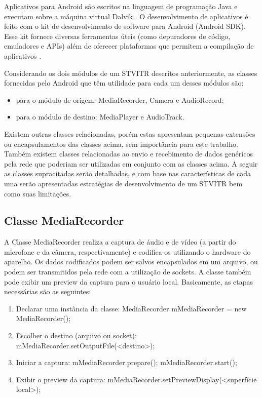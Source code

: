 \documentclass{acm_proc_article-sp}
\begin{document}
Aplicativos para Android são escritos na linguagem de programação Java e executam sobre a máquina virtual Dalvik  . O desenvolvimento de aplicativos é feito com o kit de desenvolvimento de software para Android (Android SDK). Esse kit fornece diversas ferramentas úteis (como depuradores de código, emuladores e APIs) além de oferecer plataformas que permitem a compilação de aplicativos \cite{ableson_2009}.

Considerando os dois módulos de um STVITR descritos anteriormente, as classes fornecidas pelo Android que têm utilidade para cada um desses módulos são:
\begin{itemize}
 \item para o módulo de origem: MediaRecorder, Camera e AudioRecord;
 \item para o módulo de destino: MediaPlayer e AudioTrack.
\end{itemize}

Existem outras classes relacionadas, porém estas apresentam pequenas extensões ou encapsulamentos das classes acima, sem importância para este trabalho. Também existem classes relacionadas ao envio e recebimento de dados genéricos pela rede que poderiam ser utilizadas em conjunto com as classes acima. A seguir as classes supracitadas serão detalhadas, e com base nas características de cada uma serão apresentadas estratégias de desenvolvimento de um STVITR bem como suas limitações.

\subsection{Classe MediaRecorder}
A Classe MediaRecorder realiza a captura de áudio e de vídeo (a partir do microfone e da câmera, respectivamente) e codifica-os utilizando o hardware do aparelho. Os dados codificados podem ser salvos encapsulados em um arquivo, ou podem ser transmitidos pela rede com a utilização de sockets. A classe também pode exibir um preview da captura para o usuário local.
Basicamente, as etapas necessárias são as seguintes:
\begin{enumerate}
 \item Declarar uma instância da classe:
MediaRecorder mMediaRecorder = new MediaRecorder();
 \item Escolher o destino (arquivo ou socket):
mMediaRecorder.setOutputFile(<destino>);
 \item Iniciar a captura:
mMediaRecorder.prepare();
mMediaRecorder.start();
 \item Exibir o preview da captura:
mMediaRecorder.setPreviewDisplay(<superfície local>);
\end{enumerate}
\end{document}
